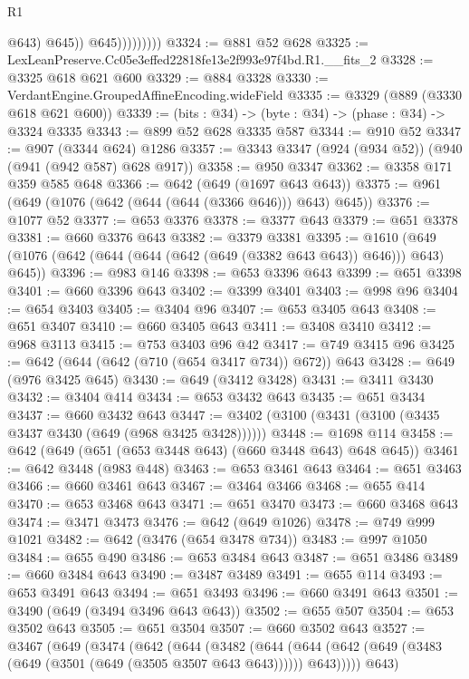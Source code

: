 \begin{lexlean}{R1}
\begin{coremodule}
                            @643)
                          @645))
                      @645)))))))))
@3324 := @881 @52 @628
@3325 := LexLeanPreserve.Cc05e3effed22818fe13e2f993e97f4bd.R1.__fits_2
@3328 := @3325 @618 @621 @600
@3329 := @884 @3328
@3330 := VerdantEngine.GroupedAffineEncoding.wideField
@3335 := @3329 (@889 (@3330 @618 @621 @600))
@3339 := (bits : @34) -> (byte : @34) -> (phase : @34) -> @3324 @3335
@3343 := @899 @52 @628 @3335 @587
@3344 := @910 @52
@3347 := @907 (@3344 @624) @1286
@3357 := @3343 @3347 (@924 (@934 @52)) (@940 (@941 (@942 @587) @628 @917))
@3358 := @950 @3347
@3362 := @3358 @171 @359 @585 @648
@3366 := @642 (@649 (@1697 @643 @643))
@3375 := @961 (@649 (@1076 (@642 (@644 (@644 (@3366 @646))) @643) @645))
@3376 := @1077 @52
@3377 := @653 @3376
@3378 := @3377 @643
@3379 := @651 @3378
@3381 := @660 @3376 @643
@3382 := @3379 @3381
@3395 := @1610 (@649 (@1076 (@642 (@644 (@644 (@642 (@649 (@3382 @643 @643)) @646))) @643) @645))
@3396 := @983 @146
@3398 := @653 @3396 @643
@3399 := @651 @3398
@3401 := @660 @3396 @643
@3402 := @3399 @3401
@3403 := @998 @96
@3404 := @654 @3403
@3405 := @3404 @96
@3407 := @653 @3405 @643
@3408 := @651 @3407
@3410 := @660 @3405 @643
@3411 := @3408 @3410
@3412 := @968 @3113
@3415 := @753 @3403 @96 @42
@3417 := @749 @3415 @96
@3425 := @642 (@644 (@642 (@710 (@654 @3417 @734)) @672)) @643
@3428 := @649 (@976 @3425 @645)
@3430 := @649 (@3412 @3428)
@3431 := @3411 @3430
@3432 := @3404 @414
@3434 := @653 @3432 @643
@3435 := @651 @3434
@3437 := @660 @3432 @643
@3447 := @3402 (@3100 (@3431 (@3100 (@3435 @3437 @3430 (@649 (@968 @3425 @3428))))))
@3448 := @1698 @114
@3458 := @642 (@649 (@651 (@653 @3448 @643) (@660 @3448 @643) @648 @645))
@3461 := @642 @3448 (@983 @448)
@3463 := @653 @3461 @643
@3464 := @651 @3463
@3466 := @660 @3461 @643
@3467 := @3464 @3466
@3468 := @655 @414
@3470 := @653 @3468 @643
@3471 := @651 @3470
@3473 := @660 @3468 @643
@3474 := @3471 @3473
@3476 := @642 (@649 @1026)
@3478 := @749 @999 @1021
@3482 := @642 (@3476 (@654 @3478 @734))
@3483 := @997 @1050
@3484 := @655 @490
@3486 := @653 @3484 @643
@3487 := @651 @3486
@3489 := @660 @3484 @643
@3490 := @3487 @3489
@3491 := @655 @114
@3493 := @653 @3491 @643
@3494 := @651 @3493
@3496 := @660 @3491 @643
@3501 := @3490 (@649 (@3494 @3496 @643 @643))
@3502 := @655 @507
@3504 := @653 @3502 @643
@3505 := @651 @3504
@3507 := @660 @3502 @643
@3527 := @3467
    (@649
      (@3474
        (@642
          (@644
            (@3482
              (@644
                (@644 (@642 (@649 (@3483 (@649 (@3501 (@649 (@3505 @3507 @643 @643)))))) @643)))))
          @643)

\end{coremodule}
\end{lexlean}
